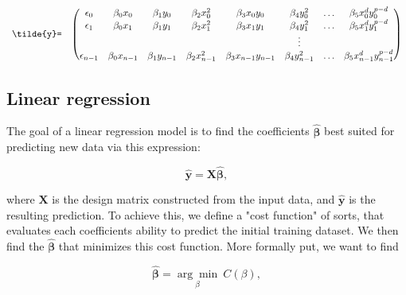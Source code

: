 \documentclass[../main.tex]{subfiles}
\begin{document}
\[
\begin{array}{lccccccc}
  \verb|\tilde{y}=| & \left(\begin{array}{@{}cccccccc@{}}
    \epsilon_0 & \beta_0 x_0 &  \beta_1 y_0 &  \beta_2 x_0^2 &  \beta_3 x_0y_0 &  \beta_4 y_0^2 & \ldots &  \beta_5 x_0^d y_0^{p-d}\\
    \epsilon_1 & \beta_0 x_1 &  \beta_1 y_1 &  \beta_2 x_1^2 &  \beta_3 x_1y_1 &  \beta_4 y_1^2 & \ldots &  \beta_5 x_1^d y_1^{p-d}\\
     &  &  &  &  & \vdots & \\
    \epsilon_{n-1} & \beta_0 x_{n-1} & \beta_1 y_{n-1} & \beta_2 x_{n-1}^2 & \beta_3 x_{n-1}y_{n-1} & \beta_4 y_{n-1}^2 & \ldots & \beta_5 x_{n-1}^d y_{n-1}^{p-d}\\
 \end{array}\right) \\[15pt]
\end{array}
\]

\subsection{Linear regression}
The goal of a linear regression model is to find the coefficients $\hat{\mathbf \beta}$ best suited for predicting new data via this expression:

\begin{equation*}
  \hat{\mathbf y} = \mathbf X\hat{\mathbf \beta},
\end{equation*}

where $\mathbf X$ is the design matrix constructed from the input data, and $\hat{\mathbf y}$ is the resulting prediction. To achieve this, we define a "cost function" of sorts, that evaluates each coefficients ability to predict the initial training dataset. We then find the $\hat{\mathbf \beta}$ that minimizes this cost function. More formally put, we want to find

\begin{equation}
  \hat{\mathbf \beta} = \underset{\beta}{\arg \min}\ C(\beta),
\end{equation}
\end{document}
